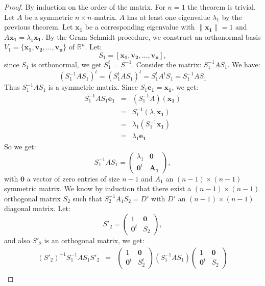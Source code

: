 \documentclass[a4paper,11pt]{report}
\newcommand{\R}{{\mathbb R}}
\begin{document}
 \begin{proof}
By induction on the order of the matrix. For $n=1$ the theorem is trivial. Let $A$ 
be a symmetric $n\times n$-matrix. $A$ has at least one eigenvalue $\lambda_1$ by the 
previous theorem. Let $\mathbf{x_1}$ be a corresponding eigenvalue with $\|\mathbf{x_1}\|=1$ 
and $A\mathbf{x_1}=\lambda_1\mathbf{x_1}$. By the Gram-Schmidt procedure, we construct an 
orthonormal basis $V_1 = \{\mathbf{x_1}, \mathbf{v_2},\ldots,\mathbf{v_n}\}$ of 
$\R^n$.
Let:
$$S_1= [\mathbf{x_1},\mathbf{v_2},\ldots,\mathbf{v_n}],$$
since $S_1$ is orthonormal, we get $S^t_1 = S^{-1}$. Consider the matrix:
$S_1^{-1}AS_1$. We have:
$$(S_1^{-1}AS_1)^t = (S_1^{t}AS_1)^t = S_1^t A^t S_1 = S^{-1}_1AS_1$$
Thus $S_1^{-1}AS_1$ is a symmetric matrix. Since $S_1\mathbf{e_1} = \mathbf{x_1}$, we get:
\begin{eqnarray*}
 S_1^{-1}AS_1\mathbf{e_1} &=& (S_1^{-1} A)(\mathbf{x_1})\\
 &=& S_1^{-1}(\lambda_1\mathbf{x_1})\\
 &=& \lambda_1(S_1^{-1}\mathbf{x_1})\\
 &=& \lambda_1 \mathbf{e_1}
\end{eqnarray*}
So we get:
$$S_1^{-1}AS_1=\left(
\begin{array}{c|c}
\lambda_1 & \mathbf{0} \\ \hline
\mathbf{0}^t & \mathbf{A_1}
\end{array}\right),$$
with $\mathbf{0}$ a vector of zero entries of size $n-1$ and $A_1$ an $(n-1)\times(n-1)$ symmetric matrix. 
We know by induction that there exist a $(n-1)\times(n-1)$ orthogonal matrix $S_2$ such that 
$S_2^{-1}A_1S_2 = D'$ with $D'$ an  $(n-1)\times(n-1)$ diagonal matrix. Let:
$$S'_2=\left(
\begin{array}{c|c}
1 & \mathbf{0} \\ \hline
\mathbf{0}^t & S_2
\end{array}\right),$$
and also $S'_2$ is an orthogonal matrix, we get:
\begin{eqnarray*}
 \left(S'_2\right)^{-1}S_1^{-1}A S_1 S'_2 &=& \left(
\begin{array}{c|c}
1 & \mathbf{0} \\ \hline
\mathbf{0}^t & S^t_2
\end{array}\right) \left(S_1^{-1}A S_1\right) \left(
\begin{array}{c|c}
1 & \mathbf{0} \\ \hline
\mathbf{0}^t & S_2
\end{array}\right) \\

\end{eqnarray*}
\end{proof}
\end{document}
